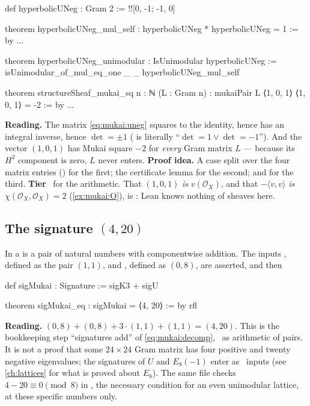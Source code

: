 \begin{leanbox}
\begin{leancode}
def hyperbolicUNeg : Gram 2 := !![0, -1; -1, 0]

theorem hyperbolicUNeg_mul_self : hyperbolicUNeg * hyperbolicUNeg = 1 := by ...

theorem hyperbolicUNeg_unimodular : IsUnimodular hyperbolicUNeg :=
  isUnimodular_of_mul_eq_one _ _ hyperbolicUNeg_mul_self

theorem structureSheaf_mukai_sq {n : ℕ} (L : Gram n) :
    mukaiPair L ⟨1, 0, 1⟩ ⟨1, 0, 1⟩ = -2 := by ...
\end{leancode}
\textbf{Reading.} The matrix \eqref{eq:mukai:uneg} squares to the identity, hence has an
integral inverse, hence $\det=\pm1$ ( is literally
``$\det=1\lor\det=-1$''). And the vector $(1,0,1)$ has Mukai square $-2$ for \emph{every} Gram
matrix $L$ --- because its $H^2$ component is zero, $L$ never enters. \textbf{Proof idea.} A
case split over the four matrix entries () for the first; the certificate lemma
 for the second;  and  for the
third. \textbf{Tier} \TA\ for the arithmetic. That $(1,0,1)$ \emph{is} $v(\mathcal O_X)$, and
that $-\langle v,v\rangle$ \emph{is} $\chi(\mathcal O_X,\mathcal O_X)=2$ (\cref{ex:mukai:O}), is
\TL: Lean knows nothing of sheaves here.
\end{leanbox}

\subsection{The signature \texorpdfstring{$(4,20)$}{(4,20)}}
In  a  is a pair of natural
numbers with componentwise addition. The inputs , defined as the pair $(1,1)$, and
, defined as $(0,8)$, are asserted, and then
\begin{leancode}
def sigMukai : Signature := sigK3 + sigU

theorem sigMukai_eq : sigMukai = ⟨4, 20⟩ := by
  rfl
\end{leancode}
\textbf{Reading.} $(0,8)+(0,8)+3\cdot(1,1)+(1,1)=(4,20)$. This is the bookkeeping step
``signatures add'' of \eqref{eq:mukai:decomp}, \TA\ as arithmetic of pairs. It is not a proof
that some $24\times24$ Gram matrix has four positive and twenty negative eigenvalues; the
signatures of $U$ and $E_8(-1)$ enter as \TL\ inputs (see \cref{ch:lattices} for what is proved
about $E_8$). The same file checks $4-20\equiv0\pmod 8$ in , the
necessary condition for an even unimodular lattice, at these specific numbers only.

